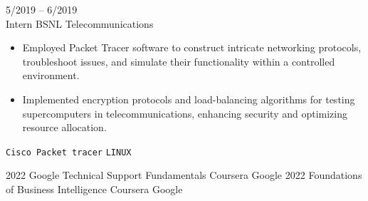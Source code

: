 \documentclass[9pt]{developercv} %
\begin{document}
\begin{entrylist}
	\entry
		{5/2019 -- 6/2019 \\\footnotesize}
		{Intern}
		{BSNL Telecommunications}
		{\vspace{-10pt}
        \begin{itemize}[noitemsep,topsep=0pt,parsep=0pt,partopsep=0pt, leftmargin=-1pt]
            \item Employed Packet Tracer software to construct intricate networking protocols, troubleshoot issues, and simulate their functionality within a controlled environment.
            \item Implemented encryption protocols and load-balancing algorithms for testing supercomputers in telecommunications, enhancing security and optimizing resource allocation.
        \end{itemize} 
        \texttt{Cisco Packet tracer} \slashsep \texttt{LINUX}}
\end{entrylist}
\vspace{-10 pt}
\begin{entrylist}
    \entry
		{2022}
		{Google Technical Support Fundamentals}
		{Coursera}
        {Google}
    \entry
		{2022}
		{Foundations of Business Intelligence}
		{Coursera}
        {Google}
\end{entrylist}
\end{document}

